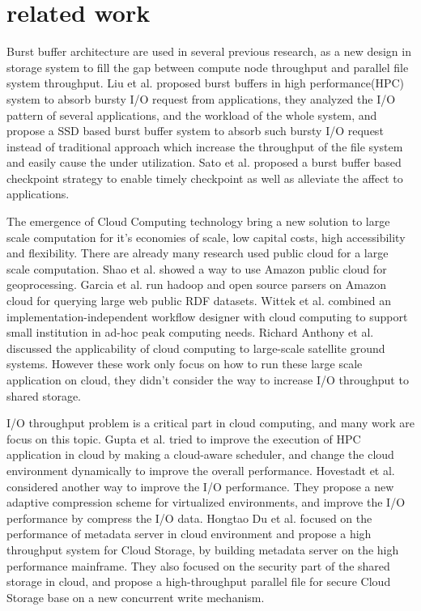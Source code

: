 \section{related work}
\label{sec:related work}

Burst buffer architecture are used in several previous research, as a new design in storage system
to fill the gap between compute node throughput and parallel file system throughput.
Liu et al. \cite{on_the_role_of_burst_buffers} proposed burst buffers in
high performance(HPC) system to absorb bursty I/O request from applications, they analyzed the I/O
pattern of several applications, and the workload of the whole system, and propose a SSD based burst
buffer system to absorb such bursty I/O request instead of traditional approach which increase the
throughput of the file system and easily cause the under utilization.
Sato et al.\cite{checkpointing} proposed a burst buffer based checkpoint
strategy to enable timely checkpoint as well as alleviate the affect to applications.

The emergence of Cloud Computing technology bring a new solution to large scale computation for it's
economies of scale, low capital costs, high accessibility and flexibility.
There are already many research used public cloud for a large scale computation.
Shao et al.\cite{Geoprocessing_on_the_Amazon_cloud_computing_platform} showed a
way to use Amazon public cloud for geoprocessing.
Garcia et al.\cite{Analysis_of_Big_Data_Technologies_and_Method} run hadoop and
open source parsers on Amazon cloud for querying large web public RDF datasets.
Wittek et al.\cite{XML_Processing_in_the_Cloud} combined an
implementation-independent workflow designer with cloud computing to support small institution in ad-hoc
peak computing needs.
Richard Anthony et
al.\cite{Cloud_computing_applications_for_large-scale_satellite_ground_systems}
discussed the applicability of cloud computing to large-scale satellite ground systems.
However these work only focus on how to run these large scale application on cloud, they didn't
consider the way to increase I/O throughput to shared storage.

I/O throughput problem is a critical part in cloud computing, and many work are focus on this
topic.
Gupta et al.\cite{Towards_Efficient_Mapping} tried to improve the
execution of HPC application in cloud by making a cloud-aware scheduler, and change the cloud environment
dynamically to improve the overall performance.
Hovestadt et al.\cite{Evaluating_Adaptive_Compression} considered another way to
improve the I/O performance.
They propose a new adaptive compression scheme for virtualized environments, and improve the I/O
performance by compress the I/O data.
Hongtao Du et
al.\cite{DHFS:_A_High-Throughput_Heterogeneous_File_System_Based_on_Mainframe_for_Cloud_Storage}
focused on the performance of metadata server in cloud environment and propose a high throughput system for Cloud Storage, by building metadata server on the high performance mainframe.
They also focused on the security part of the shared storage in cloud, and propose a
high-throughput parallel file for secure Cloud Storage base on a new concurrent write
mechanism\cite{PsFS:_A_high-throughput_parallel_file_system_for_secure_Cloud_Storage_system}.
